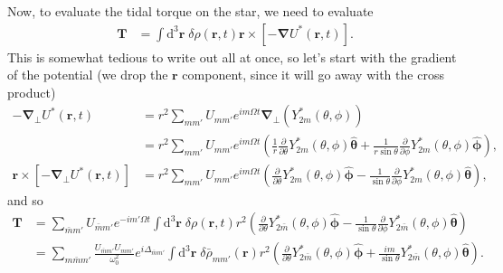\documentclass[12pt]{article}
\newcommand*{\pd}[2]{\frac{\partial#1}{\partial#2}}
\newcommand*{\bm}[1]{\boldsymbol{\mathbf{#1}}}
\newcommand*{\uv}[1]{\hat{\bm{#1}}}
\newcommand*{\p}[1]{\left(#1\right)}
\newcommand*{\s}[1]{\left[#1\right]}
\begin{document}
Now, to evaluate the tidal torque on the star, we need to evaluate
\begin{align}
    \bm{T}
        &=
            \int\limits\mathrm{d}^3\bm{r}\;
                \delta\rho\p{\bm{r}, t}
                \bm{r} \times \s{-\bm{\nabla} U^*\p{\bm{r}, t}}.
\end{align}
This is somewhat tedious to write out all at once, so let's start with the
gradient of the potential (we drop the $\bm{r}$ component, since it will go away
with the cross product)
\begin{align}
    -\bm{\nabla}_\perp U^*\p{\bm{r}, t}
        &=
            r^2
            \sum\limits_{mm'}
            U_{mm'}
            e^{im\Omega t}
            \bm{\nabla}_{\perp}
            (Y^*_{2m}(\theta, \phi))\nonumber\\
        &=
            r^2
            \sum\limits_{mm'}
            U_{mm'}
            e^{im\Omega t}
            \p{
                \frac{1}{r} \pd{}{\theta}Y^*_{2m}\p{\theta, \phi}\uv{\theta}
                + \frac{1}{r\sin\theta}
                    \pd{}{\phi}Y^*_{2m}\p{\theta, \phi}\uv{\phi}
            },\\
    \bm{r} \times \s{-\bm{\nabla}_\perp U^*\p{\bm{r}, t}}
        &=
            r^2
            \sum\limits_{mm'}
            U_{mm'}
            e^{im\Omega t}
            \p{
                \pd{}{\theta}Y^*_{2m}\p{\theta, \phi}\uv{\phi}
                - \frac{1}{\sin\theta}
                    \pd{}{\phi}Y^*_{2m}\p{\theta, \phi}\uv{\theta}
            },
\end{align}
and so
\begin{align}
    \bm{T}
        &=
            \sum\limits_{\bar{m}m'}
            U_{\bar{m}m'}
            e^{-im'\Omega t}
            \int\limits\mathrm{d}^3\bm{r}\;
                \delta\rho\p{\bm{r}, t}
                r^2
                \p{
                    \pd{}{\theta}Y^*_{2\bar{m}}\p{\theta, \phi}\uv{\phi}
                    - \frac{1}{\sin\theta}
                        \pd{}{\phi}Y^*_{2\bar{m}}\p{\theta, \phi}\uv{\theta}
                }\nonumber\\
        &=
            \sum\limits_{m\bar{m}m'}
            \frac{U_{\bar{m}m'}U_{mm'}}{\omega_0^2}
            e^{i\Delta_{\bar{m}m'}}
            \int\limits\mathrm{d}^3\bm{r}\;
                \delta\bar{\rho}_{mm'}\p{\bm{r}}
                r^2
                \p{
                    \pd{}{\theta}Y^*_{2\bar{m}}\p{\theta, \phi}\uv{\phi}
                    + \frac{im}{\sin\theta}
                        Y^*_{2\bar{m}}\p{\theta, \phi}\uv{\theta}
                }.
\end{align}
\end{document}
